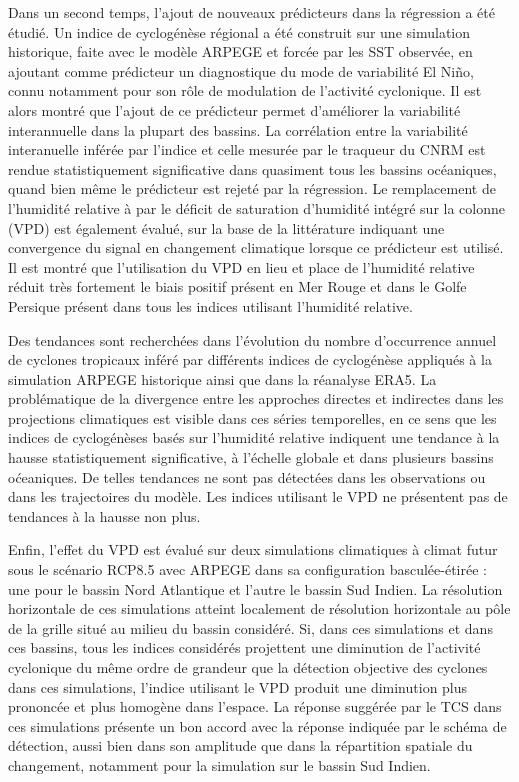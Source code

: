 \documentclass[../main.tex]{subfiles}
\begin{document}
Dans un second temps, l'ajout de nouveaux prédicteurs dans la régression a été étudié. Un indice de cyclogénèse régional a été construit sur une simulation
historique, faite avec le modèle ARPEGE et forcée par les SST observée, en ajoutant comme prédicteur un diagnostique du mode de variabilité El Niño, connu
notamment pour son rôle de modulation de l'activité cyclonique. Il est alors montré que l'ajout de ce prédicteur permet d'améliorer la variabilité interannuelle
dans la plupart des bassins. La corrélation entre la variabilité interanuelle inférée par l'indice et celle mesurée par le traqueur du CNRM est rendue
statistiquement significative dans quasiment tous les bassins océaniques, quand bien même le prédicteur est rejeté par la régression. Le remplacement de
l'humidité relative à  par le déficit de saturation d'humidité intégré sur la colonne (VPD) est également évalué, sur la base de la littérature
indiquant une convergence du signal en changement climatique lorsque ce prédicteur est utilisé. Il est montré que l'utilisation du VPD en lieu et place de
l'humidité relative réduit très fortement le biais positif présent en Mer Rouge et dans le Golfe Persique présent dans tous les indices utilisant l'humidité
relative.

Des tendances sont recherchées dans l'évolution du nombre d'occurrence annuel de cyclones tropicaux inféré par différents indices de cyclogénèse appliqués à la
simulation ARPEGE historique ainsi que dans la réanalyse ERA5. La problématique de la divergence entre les approches directes et indirectes dans les projections
climatiques est visible dans ces séries temporelles, en ce sens que les indices de cyclogénèses basés sur l'humidité relative indiquent une tendance à la hausse
statistiquement significative, à l'échelle globale et dans plusieurs bassins oćeaniques. De telles tendances ne sont pas détectées dans les observations ou
dans les trajectoires du modèle. Les indices utilisant le VPD ne présentent pas de tendances à la hausse non plus.

Enfin, l'effet du VPD est évalué sur deux simulations climatiques à climat futur sous le scénario RCP8.5 avec ARPEGE dans sa configuration basculée-étirée : une
pour le bassin Nord Atlantique et l'autre le bassin Sud Indien. La résolution horizontale de ces simulations atteint localement  de résolution
horizontale au pôle de la grille situé au milieu du bassin considéré. Si, dans ces simulations et dans ces bassins, tous les indices considérés projettent une
diminution de l'activité cyclonique du même ordre de grandeur que la détection objective des cyclones dans ces simulations, l'indice utilisant le VPD produit
une diminution plus prononcée et plus homogène dans l'espace. La réponse suggérée par le TCS dans ces simulations présente un bon accord avec la réponse
indiquée par le schéma de détection, aussi bien dans son amplitude que dans la répartition spatiale du changement, notamment pour la simulation sur le bassin
Sud Indien.
\end{document}
